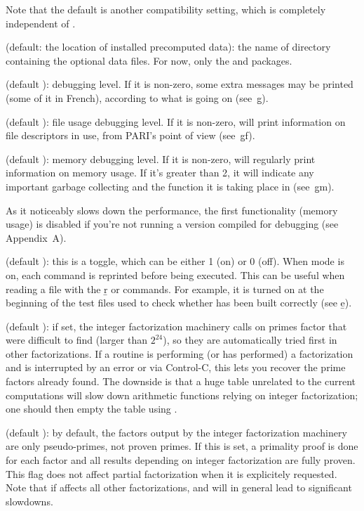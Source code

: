 Note that the default  is another compatibility setting,
which is completely independent of .

 (default: the location of installed precomputed data):
the name of directory containing the optional data files. For now,
only the  and  packages.

 (default ): debugging level. If it is non-zero,
some extra messages may be printed (some of it in French), according to
what is going on (see~\b{g}).

 (default ): file usage debugging level. If it
is non-zero,  will print information on file descriptors in use, from
PARI's point of view (see~\b{gf}).

 (default ): memory debugging level. If it is
non-zero,  will regularly print information on memory usage. If it's
greater than 2, it will indicate any important garbage collecting and the
function it is taking place in (see~\b{gm}).

 As it noticeably slows down the performance,
the first functionality (memory usage) is disabled if you're not running a
version compiled for debugging (see Appendix~A).

 (default ): this is a toggle, which can be either 1
(on) or 0 (off). When  mode is on, each command is reprinted before
being executed. This can be useful when reading a file with the \b{r} or
 commands. For example, it is turned on at the beginning of the
test files used to check whether  has been built correctly (see
\b{e}).

 (default ): if
set, the integer factorization machinery calls  on primes
factor that were difficult to find (larger than $2^24$), so they are
automatically tried first in other factorizations. If a routine is performing
(or has performed) a factorization and is interrupted by an error or via
Control-C, this lets you recover the prime factors already found. The
downside is that a huge  table unrelated to the current
computations will slow down arithmetic functions relying on integer
factorization; one should then empty the table using .

 (default ): by
default, the factors output by the integer factorization machinery are
only pseudo-primes, not proven primes. If this is
set, a primality proof is done for each factor and all results depending on
integer factorization are fully proven. This flag does not affect partial
factorization when it is explicitely requested. Note that if affects all
other factorizations, and will in general lead to significant slowdowns.

